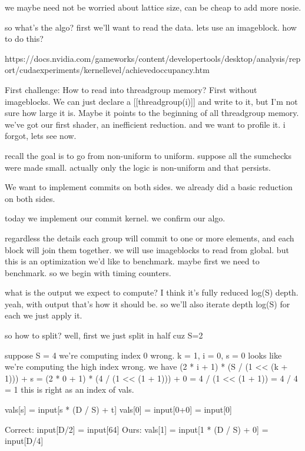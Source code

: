 we maybe need not be worried about lattice size, can be cheap to add more nosie. 

so what's the algo?
first we'll want to read the data. lets use an imageblock.
how to do this?

https://docs.nvidia.com/gameworks/content/developertools/desktop/analysis/report/cudaexperiments/kernellevel/achievedoccupancy.htm

First challenge:
How to read into threadgroup memory? First without imageblocks. 
We can just declare a [[threadgroup(i)]] and write to it, but I'm not sure how large it is. Maybe it points to the beginning of all threadgroup memory. 
we've got our first shader, an inefficient reduction. and we want to profile it. 
i forgot, lets see now. 


recall the goal is to go from non-uniform to uniform.
suppose all the sumchecks were made small. 
actually only the logic is non-uniform and that persists.





We want to implement commits on both sides.
we already did a basic reduction on both sides.

today we implement our commit kernel.
we confirm our algo.

regardless the details each group will commit to one or more elements, and each block will join them together.
we will use imageblocks to read from global. 
but this is an optimization we'd like to benchmark.
maybe first we need to benchmark. 
so we begin with timing counters.









what is the output we expect to compute?
I think it's fully reduced log(S) depth.
yeah, with output that's how it should be.
so we'll also iterate depth log(S)
for each we just apply it. 

so how to split?
well, first we just split in half cuz S=2

suppose S = 4
we're computing index 0 wrong. 
k = 1, i = 0, s = 0
looks like we're computing the high index wrong.
we have
(2 * i + 1) * (S / (1 << (k + 1))) + s
= (2 * 0 + 1) * (4 / (1 << (1 + 1))) + 0
= 4 / (1 << (1 + 1)) = 4 / 4 = 1
this is right as an index of vals.

vals[s] = input[s * (D / S) + t]
vals[0] = input[0+0] = input[0]

Correct: input[D/2] = input[64]
Ours: vals[1] = input[1 * (D / S) + 0] = input[D/4]

